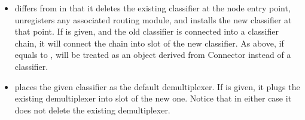 \begin{itemize}
\begin{itemize}
    {\bf NOTE}:  needs NOT to be a classifier. In some
    cases one may want to put an agent, or any class derived from
    Connector, at the entry point of a node. In such cases, one simply
    supplies  to parameter .
  \item {} differs from
     in that it deletes the existing
    classifier at the node entry point, unregisters any associated
    routing module, and installs the new classifier at that point. 
    If  is given, and the old classifier is connected into
    a classifier chain, it will connect the chain into slot
     of the new classifier. 
    As above, if  equals to , 
    will be treated as an object derived from Connector instead of a
    classifier. 
  \item {} places the given
    classifier  as the default demultiplexer. If
     is given, it plugs the existing demultiplexer into
    slot  of the new one. Notice that in either case it does
    not delete the existing demultiplexer.
  \end{itemize}
\end{itemize}

